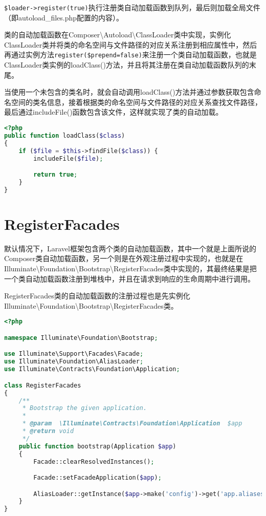 \texttt{\$loader->register(true)}执行注册类自动加载函数到队列，最后则加载全局文件（即autoload\_files.php配置的内容）。

类的自动加载函数在Composer\textbackslash Autoload\textbackslash ClassLoader类中实现，实例化ClassLoader类并将类的命名空间与文件路径的对应关系注册到相应属性中，然后再通过实例方法\texttt{register(\$prepend=false)}来注册一个类自动加载函数，也就是ClassLoader类实例的loadClass()方法，并且将其注册在类自动加载函数队列的末尾。

当使用一个未包含的类名时，就会自动调用loadClass()方法并通过参数获取包含命名空间的类名信息，接着根据类的命名空间与文件路径的对应关系查找文件路径，最后通过includeFile()函数包含该文件，这样就实现了类的自动加载。

\begin{lstlisting}[language=PHP]
<?php
public function loadClass($class)
{
    if ($file = $this->findFile($class)) {
        includeFile($file);

        return true;
    }
}

\end{lstlisting}


\section{RegisterFacades}



默认情况下，Laravel框架包含两个类的自动加载函数，其中一个就是上面所说的Composer类自动加载函数，另一个则是在外观注册过程中实现的，也就是在Illuminate\textbackslash Foundation\textbackslash Bootstrap\textbackslash RegisterFacades类中实现的，其最终结果是把一个类自动加载函数注册到堆栈中，并且在请求到响应的生命周期中进行调用。

RegisterFacades类的自动加载函数的注册过程也是先实例化Illuminate\textbackslash Foundation\textbackslash Bootstrap\textbackslash RegisterFacades类。


\begin{lstlisting}[language=PHP]
<?php

namespace Illuminate\Foundation\Bootstrap;

use Illuminate\Support\Facades\Facade;
use Illuminate\Foundation\AliasLoader;
use Illuminate\Contracts\Foundation\Application;

class RegisterFacades
{
    /**
     * Bootstrap the given application.
     *
     * @param  \Illuminate\Contracts\Foundation\Application  $app
     * @return void
     */
    public function bootstrap(Application $app)
    {
        Facade::clearResolvedInstances();

        Facade::setFacadeApplication($app);

        AliasLoader::getInstance($app->make('config')->get('app.aliases'))->register();
    }
}
\end{lstlisting}

